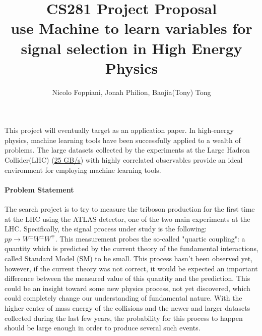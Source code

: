\documentclass[11pt]{article}
\title{CS281 Project Proposal \\
	\large use Machine to learn variables for signal selection in High Energy Physics}
\author{Nicolo Foppiani, Jonah Philion, Baojia(Tony) Tong}
\date{}                                           %
\begin{document}
\maketitle

\paragraph{}
This project will eventually target as an application paper. In high-energy physics, machine learning tools have been successfully applied to a wealth of problems. The large datasets collected by the experiments at the Large Hadron Collider(LHC) (\href{https://home.cern/about/computing/processing-what-record}{25 GB/s}) with highly correlated observables provide an ideal environment for employing machine learning tools.

\paragraph{Problem Statement}
The search project is to try to measure the triboson production for the first time at the LHC using the ATLAS detector, one of the two main experiments at the LHC. Specifically, the signal process under study is the following: $pp \rightarrow W^{\pm}W^{\pm}W^{\mp}$. 
This measurement probes the so-called "quartic coupling": a quantity which is predicted by the current theory of the fundamental interactions, called Standard Model (SM) to be small. This process hasn't been observed yet, however, if the current theory was not correct, it would be expected an important difference between the measured value of this quantity and the prediction. This could be an insight toward some new physics process, not yet discovered, which could completely change our understanding of fundamental nature. With the higher center of mass energy of the collisions and the newer and larger datasets collected during the last few years, the probability for this process to happen should be large enough in order to produce several such events.
\end{document}
